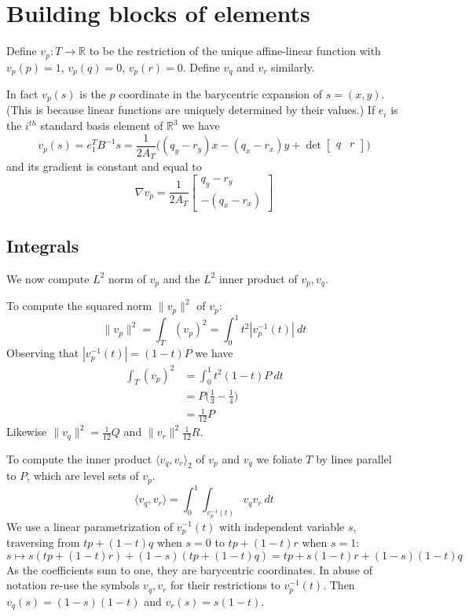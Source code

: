 \documentclass[12pt]{amsart}
\providecommand{\to}{\longrightarrow }
\begin{document}
\section*{Building blocks of elements}

Define $v_p:T\to \mathbb{R}$ to be the restriction of the unique affine-linear function with $v_p(p) = 1$, $v_p(q) = 0$, $v_p(r) = 0$. Define $v_q$ and $v_r$ similarly.

In fact $v_p(s)$ is the $p$ coordinate in the barycentric expansion of $s = (x,y)$. (This is because linear functions are uniquely determined by their values.) If $e_i$ is the $i^{th}$ standard basis element of $\mathbb{R}^3$ we have
\[ v_p(s) = e_1^T B^{-1} s = \frac{1}{2A_T}\bigg( (q_y - r_y)x - (q_x - r_x)y + \det\left[\begin{array}{c|c} q & r \end{array}\right] \bigg)\]
and its gradient is constant and equal to
\[ \nabla v_p = \frac{1}{2A_T} \begin{bmatrix} q_y - r_y \\ -(q_x - r_x) \end{bmatrix} \]

\subsection*{Integrals}

We now compute $L^2$ norm of $v_p$ and the $L^2$ inner product of $v_p, v_q$.

To compute the squared norm $\|v_p\|^2$ of $v_p$:
\[ \|v_p\|^2 = \int_T (v_p)^2 = \int_0^1 t^2 |v_p^{-1}(t)|\ dt \]
Observing that $|v_p^{-1}(t)| = (1-t)P$ we have
\begin{align*}
\int_T (v_p)^2 &= \int_0^1 t^2(1-t)P\ dt\\
	& = P\bigg(\frac{1}{3} - \frac{1}{4}\bigg) \\
	& = \frac{1}{12}P
\end{align*}
Likewise $\|v_q\|^2 = \frac{1}{12}Q$ and $\|v_r\|^2 \frac{1}{12}R.$

To compute the inner product $\langle v_q, v_r\rangle_2$ of $v_p$ and $v_q$ we foliate $T$ by lines parallel to $P$, which are level sets of $v_p$.
\[ \langle v_q, v_r\rangle = \int_0^1 \int_{v_p^{-1}(t)} v_qv_r\ dt \]
We use a linear parametrization of $v_p^{-1}(t)$ with independent variable $s$, traversing from $tp + (1-t)q$ when $s=0$ to $tp + (1-t)r$ when $s=1$:
\[ s\mapsto s(tp + (1-t)r) + (1-s)(tp + (1-t)q) = tp + s(1-t)r + (1-s)(1-t)q\]
As the coefficients sum to one, they are barycentric coordinates. 
In abuse of notation re-use the symbols $v_q, v_r$ for their restrictions to $v_p^{-1}(t)$.  Then $v_q(s) = (1-s)(1-t)$ and $v_r(s) = s(1-t)$.
\end{document}
